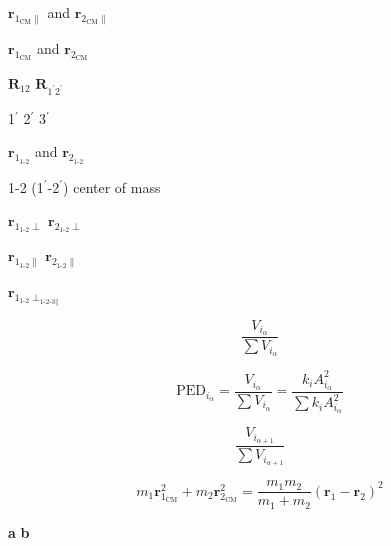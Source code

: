\documentclass[20pt]{article}
\begin{document}
\baselineskip=40pt

{\Huge

$\boldsymbol{r}_{1_{\textrm{CM}}\parallel}$ and $\boldsymbol{r}_{2_{\textrm{CM}}\parallel}$

$\boldsymbol{r}_{1_{\textrm{CM}}}$ and $\boldsymbol{r}_{2_{\textrm{CM}}}$

$\boldsymbol{R}_{12}$ $\boldsymbol{R}_{1^{\prime}2^{\prime}}$

1$^\prime$  2$^\prime$ 3$^\prime$

$\boldsymbol{r}_{1_{\textrm{1-2}}}$ and $\boldsymbol{r}_{2_{\textrm{1-2}}}$

1-2 (1$^\prime$-2$^\prime$) center of mass

$\boldsymbol{r}_{1_{\textrm{1-2}}\perp}$ $\boldsymbol{r}_{2_{\textrm{1-2}}\perp}$

$\boldsymbol{r}_{1_{\textrm{1-2}}\parallel}$ $\boldsymbol{r}_{2_{\textrm{1-2}}\parallel}$

$\boldsymbol{r}_{1_{\textrm{1-2}}\perp_{{\textrm{1-2-3}}\parallel}}$

\begin{equation}
\frac{V_{i_{\alpha}}}{\sum V_{i_{\alpha}}}
\end{equation}

\begin{equation}
\textrm{PED}_{i_{\alpha}} = \frac{V_{i_{\alpha}}}{\sum V_{i_{\alpha}}} = \frac{k_i A^2_{i_{\alpha}}}{\sum k_i A^2_{i_{\alpha}}}
\end{equation}

\begin{equation}
\frac{V_{i_{\alpha+1}}}{\sum V_{i_{\alpha+1}}}
\end{equation}




\begin{equation}
\label{eq:12KED}
m_1\boldsymbol{r}^2_{1_{\textrm{CM}}} + m_2\boldsymbol{r}^2_{2_{\textrm{CM}}} = 
\frac{m_1 m_2}{m_1 + m_2} (\boldsymbol{r}_{1} - \boldsymbol{r}_{2})^2
\end{equation}

{\bf a} {\bf b}


}
\end{document}

